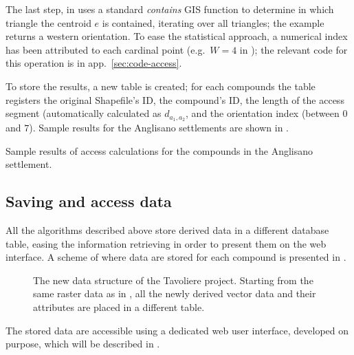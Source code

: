                The last step, in  uses a standard \emph{contains} GIS function to determine in which triangle the centroid $e$ is contained, iterating over all triangles; the example returns a western orientation. To ease the statistical approach, a numerical index has been attributed to each cardinal point (e.g.\ $W = 4$ in ); the relevant code for this operation is in app.~\ref{sec:code-access}.

                To store the results, a new table is created; for each compounds the table registers the original Shapefile's ID, the compound's ID, the length of the access segment (automatically calculated as $d_{a_1, a_2}$, and the orientation index (between $0$ and $7$). Sample results for the Anglisano settlements are shown in .
                \begin{table}[!htb]
                    \centering
                    
                    \caption[Sample results of access calculations for the compounds in the Anglisano settlement.]{Sample results of access calculations for the compounds in the Anglisano settlement.}
                    \label{tab:tab-access-anglisano}
                \end{table}

        \subsection{Saving and access data}
            All the algorithms described above store derived data in a different database table, easing the information retrieving in order to present them on the web interface. A scheme of where data are stored for each compound is presented in .

            \begin{figure}[H]
                \centering
                \caption[The three diffrent tables to store compound's derived data.]{The new data structure of the Tavoliere project. Starting from the same raster data as in , all the newly derived vector data and their attributes are placed in a different table.}
                \label{fig:scheme-derive-2}
            \end{figure}

            The stored data are accessible using a dedicated web user interface, developed on purpose, which will be described in .

